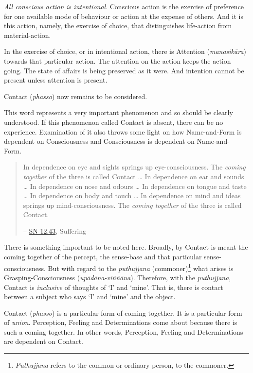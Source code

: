 \emph{All conscious action is intentional}. Conscious action is the exercise of preference for one available mode of behaviour or action at the expense of others. And it is this action, namely, the exercise of choice, that distinguishes life-action from material-action.

In the exercise of choice, or in intentional action, there is Attention (\textit{manasikāra}) towards that particular action. The attention on the action keeps the action going. The state of affairs is being preserved as it were. And intention cannot be present unless attention is present.

Contact (\textit{phasso}) now remains to be considered.

This word represents a very important phenomenon and so should be clearly understood. If this phenomenon called Contact is absent, there can be no experience. Examination of it also throws some light on how Name-and-Form is dependent on Consciousness and Consciousness is dependent on Name-and- Form.

\begin{quote}
In dependence on eye and sights springs up eye-consciousness. The \emph{coming together} of the three is called Contact \ldots{} In dependence on ear and sounds \ldots{} In dependence on nose and odours \ldots{} In dependence on tongue and taste \ldots{} In dependence on body and touch \ldots{} In dependence on mind and ideas springs up mind-consciousness. The \emph{coming together} of the three is called Contact.

 -- \href{https://suttacentral.net/sn12.43/en/bodhi}{SN 12.43}, Suffering
\end{quote}

There is something important to be noted here. Broadly, by Contact is meant the coming together of the percept, the sense-base and that particular sense-consciousness. But with regard to the \textit{puthujjana} (commoner)\footnote{\textit{Puthujjana} refers to the common or ordinary person, to the commoner.} what arises is Grasping-Consciousness (\textit{upādāna-viññāna}). Therefore, with the \textit{puthujjana}, Contact is \emph{inclusive} of thoughts of `I' and `mine'. That is, there is contact between a subject who says `I' and `mine' and the object.

Contact (\textit{phasso}) is a particular form of coming together. It is a particular form of \emph{union}. Perception, Feeling and Determinations come about because there is such a coming together. In other words, Perception, Feeling and Determinations are dependent on Contact.

